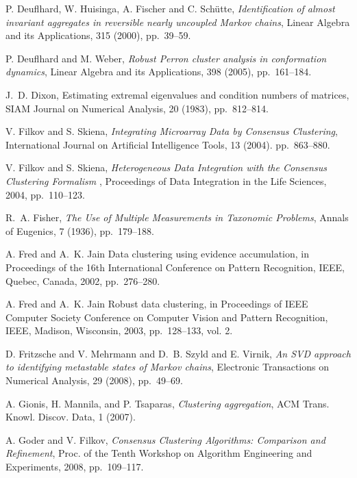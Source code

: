 \documentclass[final]{siamltex}
\begin{document}
\begin{thebibliography}{99}
 {\sc P. Deuflhard, W. Huisinga, A. Fischer and C. Sch\"{u}tte}, {\em Identification of almost invariant aggregates in reversible nearly uncoupled Markov chains}, 
Linear Algebra and its Applications, 315 (2000), pp.~39--59.

 {\sc P. Deuflhard and M. Weber}, {\em Robust Perron cluster analysis in conformation dynamics}, Linear Algebra and its Applications, 398 (2005), pp.~161--184.

 {\sc J.~D. Dixon}, {Estimating extremal eigenvalues and condition numbers of matrices}, SIAM Journal on Numerical Analysis, 20 (1983), pp.~812--814.

 {\sc V. Filkov and S. Skiena}, {\em Integrating Microarray Data by Consensus Clustering}, International Journal on Artificial Intelligence Tools, 13 (2004). pp.~863--880.

 {\sc V. Filkov and S. Skiena}, {\em Heterogeneous Data Integration with the Consensus Clustering Formalism }, Proceedings of Data Integration in the Life Sciences, 2004, pp.~110--123.

 {\sc R.~A. Fisher}, {\em The Use of Multiple Measurements in Taxonomic Problems}, Annals of Eugenics, 7 (1936), pp.~179--188.

 {\sc A. Fred and A.~K. Jain} Data clustering using evidence accumulation, in Proceedings of the 16th International Conference on Pattern Recognition, IEEE, Quebec, Canada, 2002, pp.~276--280.

 {\sc A. Fred and A.~K. Jain} Robust data clustering, in Proceedings of IEEE Computer Society Conference on Computer Vision and Pattern Recognition, IEEE, Madison, Wisconsin, 2003, pp.~128--133, vol. 2. 

 {\sc D. Fritzsche and V. Mehrmann and D.~B. Szyld and E. Virnik}, {\em An SVD approach to identifying metastable states of Markov chains}, Electronic Transactions on Numerical Analysis, 29 (2008), pp.~49--69.

 {\sc A. Gionis, H. Mannila, and P. Tsaparas}, {\em Clustering aggregation}, ACM Trans. Knowl. Discov. Data, 1 (2007).

 {\sc A. Goder and V. Filkov}, {\em Consensus Clustering Algorithms: Comparison and Refinement}, Proc. of the Tenth Workshop on Algorithm Engineering and Experiments, 2008, pp.~109--117.


\end{thebibliography}
\end{document}
